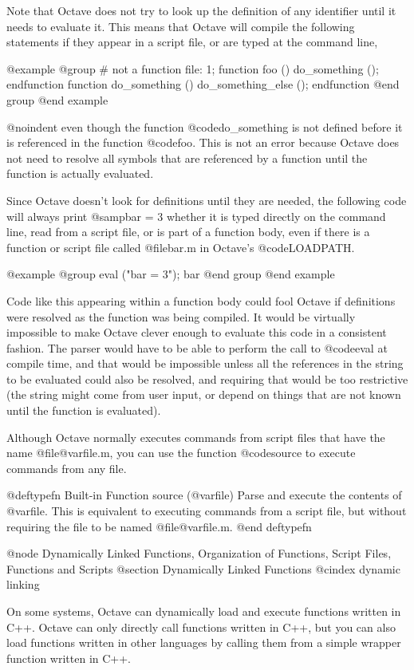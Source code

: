 Note that Octave does not try to look up the definition of any identifier
until it needs to evaluate it.  This means that Octave will compile the
following statements if they appear in a script file, or are typed at
the command line,

@example
@group
# not a function file:
1;
function foo ()
  do_something ();
endfunction
function do_something ()
  do_something_else ();
endfunction
@end group
@end example

@noindent
even though the function @code{do_something} is not defined before it is
referenced in the function @code{foo}.  This is not an error because
Octave does not need to resolve all symbols that are referenced by a
function until the function is actually evaluated.

Since Octave doesn't look for definitions until they are needed, the
following code will always print @samp{bar = 3} whether it is typed
directly on the command line, read from a script file, or is part of a
function body, even if there is a function or script file called
@file{bar.m} in Octave's @code{LOADPATH}.

@example
@group
eval ("bar = 3");
bar
@end group
@end example

Code like this appearing within a function body could fool Octave if
definitions were resolved as the function was being compiled.  It would
be virtually impossible to make Octave clever enough to evaluate this
code in a consistent fashion.  The parser would have to be able to
perform the call to @code{eval} at compile time, and that would be
impossible unless all the references in the string to be evaluated could
also be resolved, and requiring that would be too restrictive (the
string might come from user input, or depend on things that are not
known until the function is evaluated).

Although Octave normally executes commands from script files that have
the name @file{@var{file}.m}, you can use the function @code{source} to
execute commands from any file.

@deftypefn {Built-in Function} {} source (@var{file})
Parse and execute the contents of @var{file}.  This is equivalent to
executing commands from a script file, but without requiring the file to
be named @file{@var{file}.m}.
@end deftypefn

@node Dynamically Linked Functions, Organization of Functions, Script Files, Functions and Scripts
@section Dynamically Linked Functions
@cindex dynamic linking

On some systems, Octave can dynamically load and execute functions
written in C++.  Octave can only directly call functions written in C++,
but you can also load functions written in other languages
by calling them from a simple wrapper function written in C++.

